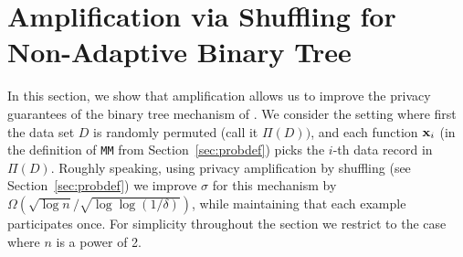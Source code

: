 \section{Amplification via Shuffling for Non-Adaptive Binary Tree }\label{sec:ftrl}

In this section, we show that amplification allows us to improve the privacy guarantees of the binary tree mechanism of \citep{dwork2010differential,CSS11-continual}. We consider the setting where first the data set $D$ is randomly permuted (call it $\Pi(D))$, and each function $\mathbf{x}_i$ (in the definition of \texttt{MM} from Section~\ref{sec:probdef}) picks the $i$-th data record in $\Pi(D)$. Roughly speaking, using privacy amplification by shuffling (see Section~\ref{sec:probdef}) we improve $\sigma$ for this mechanism by $\Omega(\sqrt{\log n} / \sqrt{\log \log (1/\delta)})$, while maintaining that each example participates once. For simplicity throughout the section we restrict to the case where $n$ is a power of 2.

